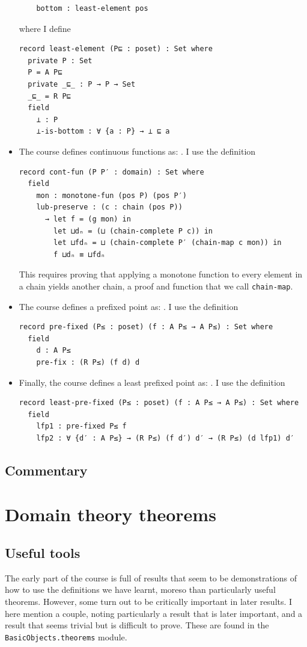 \documentclass[12pt,a4paper,twoside,openright]{report}
\begin{document}
\begin{itemize}
\begin{verbatim}
    bottom : least-element pos
\end{verbatim}
where I define
\begin{verbatim}
record least-element (P⊑ : poset) : Set where
  private P : Set
  P = A P⊑
  private _⊑_ : P → P → Set
  _⊑_ = R P⊑
  field
    ⊥ : P
    ⊥-is-bottom : ∀ {a : P} → ⊥ ⊑ a
\end{verbatim}
\item The course defines continuous functions as: . I use the definition
\begin{verbatim}
record cont-fun (P P′ : domain) : Set where
  field
    mon : monotone-fun (pos P) (pos P′)
    lub-preserve : (c : chain (pos P))
      → let f = (g mon) in
        let ⊔dₙ = (⊔ (chain-complete P c)) in
        let ⊔fdₙ = ⊔ (chain-complete P′ (chain-map c mon)) in
        f ⊔dₙ ≡ ⊔fdₙ
\end{verbatim}
This requires proving that applying a monotone function to every element in a chain yields another chain, a proof and function that we call \texttt{chain-map}. 
\item The course defines a prefixed point as: . I use the definition
\begin{verbatim}
record pre-fixed (P≤ : poset) (f : A P≤ → A P≤) : Set where
  field
    d : A P≤
    pre-fix : (R P≤) (f d) d
\end{verbatim}
\item Finally, the course defines a least prefixed point as: . I use the definition
\begin{verbatim}
record least-pre-fixed (P≤ : poset) (f : A P≤ → A P≤) : Set where
  field
    lfp1 : pre-fixed P≤ f
    lfp2 : ∀ {d′ : A P≤} → (R P≤) (f d′) d′ → (R P≤) (d lfp1) d′
\end{verbatim}
\end{itemize}
\subsection{Commentary}
\section{Domain theory theorems}
\subsection{Useful tools}
The early part of the course is full of results that seem to be demonstrations of how to use the definitions we have learnt, moreso than particularly useful theorems. However, some turn out to be critically important in later results. I here mention a couple, noting particularly a result that is later important, and a result that seems trivial but is difficult to prove. These are found in the \texttt{BasicObjects.theorems} module.
\end{document}
